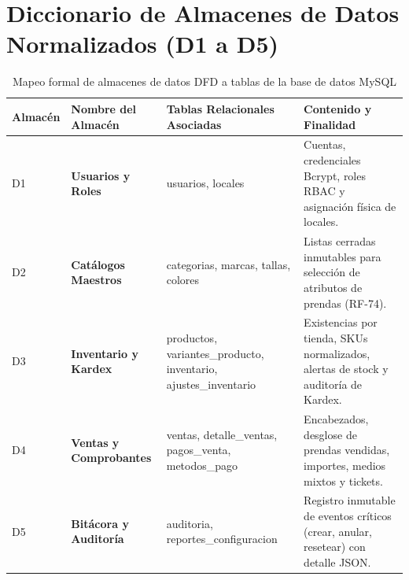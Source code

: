 \section{Diccionario de Almacenes de Datos Normalizados (D1 a D5)}
\begin{table}[H]
\centering
\small
\begin{tabularx}{\textwidth}{>{\ttfamily\centering}p{1.2cm} >{\raggedright\bfseries}p{3.8cm} >{\ttfamily\small\raggedright}p{4cm} Y}
\toprule
\textbf{Almacén} & \textbf{Nombre del Almacén} & \textbf{Tablas Relacionales Asociadas} & \textbf{Contenido y Finalidad} \\
\midrule
D1 & Usuarios y Roles & usuarios, locales & Cuentas, credenciales Bcrypt, roles RBAC y asignación física de locales. \\
\addlinespace
D2 & Catálogos Maestros & categorias, marcas, tallas, colores & Listas cerradas inmutables para selección de atributos de prendas (RF-74). \\
\addlinespace
D3 & Inventario y Kardex & productos, variantes\_producto, inventario, ajustes\_inventario & Existencias por tienda, SKUs normalizados, alertas de stock y auditoría de Kardex. \\
\addlinespace
D4 & Ventas y Comprobantes & ventas, detalle\_ventas, pagos\_venta, metodos\_pago & Encabezados, desglose de prendas vendidas, importes, medios mixtos y tickets. \\
\addlinespace
D5 & Bitácora y Auditoría & auditoria, reportes\_configuracion & Registro inmutable de eventos críticos (crear, anular, resetear) con detalle JSON. \\
\bottomrule
\end{tabularx}
\caption{Mapeo formal de almacenes de datos DFD a tablas de la base de datos MySQL}
\label{tab:almacenes_dfd}
\end{table}
